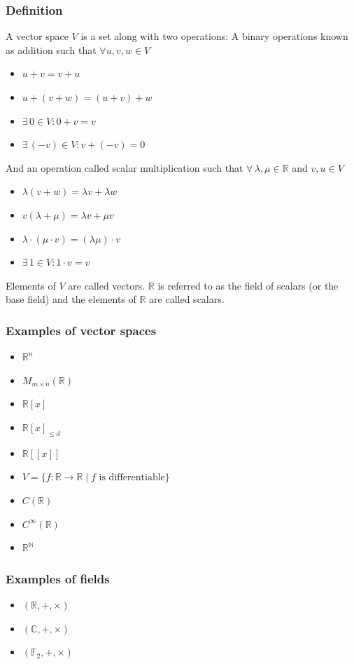 \documentclass[12pt]{article}
\begin{document}
\subsubsection*{Definition}
A vector space \(V\) is a set along with two operations: A binary operations known as addition such that \(\forall u,v,w\in V\)
\begin{itemize}
    \item \(u+v=v+u\)
    \item \(u+(v+w)=(u+v)+w\)
    \item \(\exists\, 0\in V:0+v=v\)
    \item \(\exists\,(-v)\in V:v+(-v)=0\)
\end{itemize}
And an operation called scalar multiplication such that \(\forall\,\lambda,\mu\in\mathbb{R}\) and \(v,u\in V\)
\begin{itemize}
    \item \(\lambda(v+w)=\lambda v+\lambda w\)
    \item \(v(\lambda+\mu)=\lambda v + \mu v\)
    \item \(\lambda\cdot(\mu\cdot v)=(\lambda\mu)\cdot v\)
    \item \(\exists\,1\in V:1\cdot v=v\)
\end{itemize}
Elements of \(V\) are called vectors. \(\mathbb{R}\) is referred to as the field of scalars (or the base field) and the elements of \(\mathbb{R}\) are called scalars.
\subsubsection*{Examples of vector spaces}
\begin{itemize}
    \item \(\mathbb{R}^n\)
    \item \(M_{m\times n}(\mathbb{R})\)
    \item \(\mathbb{R}[x]\)
    \item \(\mathbb{R}[x]_{\leq d}\)
    \item \(\mathbb{R}[[x]]\)
    \item \(V=\{f:\mathbb{R}\to\mathbb{R}\mid f\text{ is differentiable}\}\)
    \item \(C(\mathbb{R})\)
    \item \(C^\infty(\mathbb{R})\)
    \item \(\mathbb{R}^\mathbb{N}\)
\end{itemize}
\subsubsection*{Examples of fields}
\begin{itemize}
    \item \((\mathbb{R},+,\times)\)
    \item \((\mathbb{C},+,\times)\)
    \item \((\mathbb{F}_2,+,\times)\)
\end{itemize}
\end{document}
